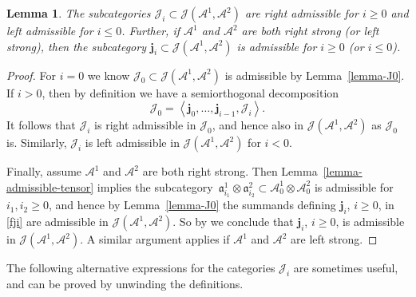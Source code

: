 \documentclass[11pt, reqno]{amsart}
\numberwithin{equation}{section}
\theoremstyle{plain}
\newtheorem{lemma}[theorem]{Lemma}
\theoremstyle{definition}
\newcommand{\llangle}{\left \langle}
\newcommand{\rrangle}{\right \rangle}
\newcommand{\sotimes}{\otimes}
\newcommand{\cA}{\mathcal{A}}
\newcommand{\cJ}{\mathcal{J}}
\newcommand{\fa}{\mathfrak{a}}
\newcommand{\fj}{\mathbf{j}}
\begin{document}
\begin{lemma}
\label{lemma-Ji-admissible}
The subcategories $\cJ_i \subset \cJ(\cA^1, \cA^2)$ are 
right admissible for $i \geq 0$ and left admissible for $i \leq 0$. 
Further, if $\cA^1$ and $\cA^2$ are both right strong \textup(or left strong\textup), 
then the subcategory $\fj_{i} \subset \cJ(\cA^1, \cA^2)$ is admissible for $i \geq 0$ \textup(or $i \leq 0$\textup). 
\end{lemma}

\begin{proof}
For $i = 0$ we know $\cJ_0 \subset \cJ(\cA^1, \cA^2)$ is admissible by Lemma~\ref{lemma-J0}. 
If $i > 0$, then by definition we have a semiorthogonal decomposition 
\begin{equation*}
\cJ_0 = \llangle \fj_0, \dots, \fj_{i-1}, \cJ_i \rrangle. 
\end{equation*} 
It follows that $\cJ_i$ is right admissible in $\cJ_0$, and hence also in $\cJ(\cA^1, \cA^2)$ 
as $\cJ_0$ is. 
Similarly, $\cJ_i$ is left admissible in $\cJ(\cA^1, \cA^2)$ for $i < 0$. 

Finally, assume $\cA^1$ and $\cA^2$ are both right strong. 
Then Lemma~\ref{lemma-admissible-tensor} implies the subcategory~$\fa^1_{i_1} \sotimes \fa^2_{i_2}  \subset \cA^1_0 \sotimes \cA^2_0$ 
is admissible for $i_1, i_2 \geq 0$, and hence by Lemma~\ref{lemma-J0} 
the summands defining $\fj_i$, $i \geq 0$, in \eqref{fji} are admissible in 
$\cJ(\cA^1, \cA^2)$. 
So by \cite[Lemma 3.10]{NCHPD} we conclude that $\fj_i$, $i \geq 0$, is admissible 
in $\cJ(\cA^1, \cA^2)$. 
A similar argument applies if $\cA^1$ and $\cA^2$ are left strong. 
\end{proof}



The following alternative expressions for the categories $\cJ_i$ are sometimes useful, 
and can be proved by unwinding the definitions. 
\end{document}
